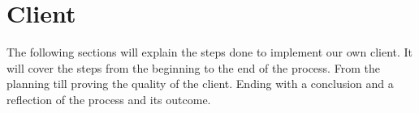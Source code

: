 \section{Client}
The following sections will explain the steps done to implement our own client. It will cover the steps from the beginning to the end of the process. From the planning till proving the quality of the client. Ending with a conclusion and a reflection of the process and its outcome.




